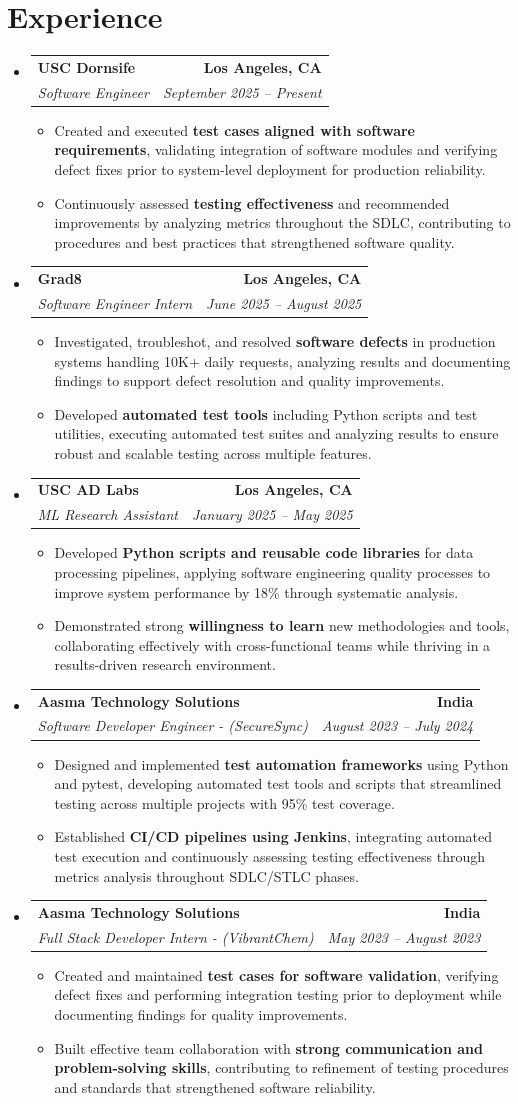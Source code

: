 \documentclass[letterpaper,10pt]{article}
\makeatletter
\newcommand{\resumeItem}[1]{\item\small{{#1 \vspace{-2pt}}}}
\newcommand{\resumeSubheading}[4]{\vspace{-1pt}\item\begin{tabular*}{1.0\textwidth}[t]{l@{\extracolsep{\fill}}r}\textbf{#1} & \textbf{\small #2} \\\textit{\small#3} & \textit{\small #4} \\\end{tabular*}\vspace{-2pt}}
\newcommand{\resumeSubHeadingListStart}{\begin{itemize}[leftmargin=0.0in, label={}]}
\newcommand{\resumeSubHeadingListEnd}{\end{itemize}}
\newcommand{\resumeItemListStart}{\begin{itemize}[leftmargin=0.15in,label=\textbullet,itemsep=2pt,topsep=0pt,parsep=0pt,partopsep=0pt]}
\newcommand{\resumeItemListEnd}{\end{itemize}\vspace{-4pt}}
\makeatother
\begin{document}
\section{Experience}
\resumeSubHeadingListStart
\resumeSubheading{USC Dornsife}{Los Angeles, CA}{Software Engineer}{September 2025 -- Present}
\resumeItemListStart
\resumeItem{Created and executed \textbf{test cases aligned with software requirements}, validating integration of software modules and verifying defect fixes prior to system-level deployment for production reliability.}
\resumeItem{Continuously assessed \textbf{testing effectiveness} and recommended improvements by analyzing metrics throughout the SDLC, contributing to procedures and best practices that strengthened software quality.}
\resumeItemListEnd
\resumeSubheading{Grad8}{Los Angeles, CA}{Software Engineer Intern}{June 2025 -- August 2025}
\resumeItemListStart
\resumeItem{Investigated, troubleshot, and resolved \textbf{software defects} in production systems handling 10K+ daily requests, analyzing results and documenting findings to support defect resolution and quality improvements.}
\resumeItem{Developed \textbf{automated test tools} including Python scripts and test utilities, executing automated test suites and analyzing results to ensure robust and scalable testing across multiple features.}
\resumeItemListEnd
\resumeSubheading{USC AD Labs}{Los Angeles, CA}{ML Research Assistant}{January 2025 -- May 2025}
\resumeItemListStart
\resumeItem{Developed \textbf{Python scripts and reusable code libraries} for data processing pipelines, applying software engineering quality processes to improve system performance by 18\% through systematic analysis.}
\resumeItem{Demonstrated strong \textbf{willingness to learn} new methodologies and tools, collaborating effectively with cross-functional teams while thriving in a results-driven research environment.}
\resumeItemListEnd
\resumeSubheading{Aasma Technology Solutions}{India}{Software Developer Engineer - (SecureSync)}{August 2023 -- July 2024}
\resumeItemListStart
\resumeItem{Designed and implemented \textbf{test automation frameworks} using Python and pytest, developing automated test tools and scripts that streamlined testing across multiple projects with 95\% test coverage.}
\resumeItem{Established \textbf{CI/CD pipelines using Jenkins}, integrating automated test execution and continuously assessing testing effectiveness through metrics analysis throughout SDLC/STLC phases.}
\resumeItemListEnd
\resumeSubheading{Aasma Technology Solutions}{India}{Full Stack Developer Intern - (VibrantChem)}{May 2023 -- August 2023}
\resumeItemListStart
\resumeItem{Created and maintained \textbf{test cases for software validation}, verifying defect fixes and performing integration testing prior to deployment while documenting findings for quality improvements.}
\resumeItem{Built effective team collaboration with \textbf{strong communication and problem-solving skills}, contributing to refinement of testing procedures and standards that strengthened software reliability.}
\resumeItemListEnd
\resumeSubHeadingListEnd
\vspace{-14pt}
\end{document}
